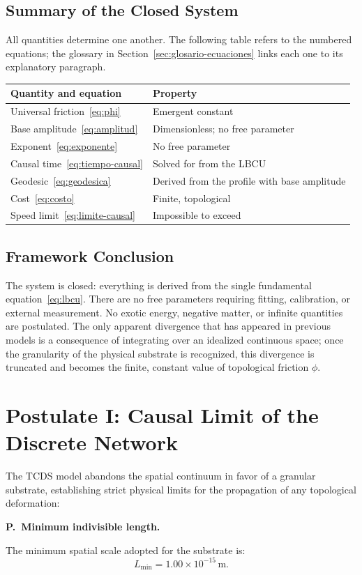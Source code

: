 \documentclass[10pt,a4paper,twocolumn]{article}
\newcounter{parrafoecuacion}
\newcommand{\parrafoecuacion}[2]{%
    \par\smallskip\Needspace{6\baselineskip}%
    \noindent\refstepcounter{parrafoecuacion}\label{#1}%
    \textbf{P\theparrafoecuacion.\ #2.}\enspace
}
\begin{document}
\subsection{Summary of the Closed System}
All quantities determine one another. The following table refers to the numbered equations; the glossary in Section~\ref{sec:glosario-ecuaciones} links each one to its explanatory paragraph.
\begin{center}
    \small
    \setlength{\tabcolsep}{3pt}
    \begin{tabularx}{\linewidth}{@{}>{\raggedright\arraybackslash}X >{\raggedright\arraybackslash}X@{}}
        \toprule
        Quantity and equation & Property\\
        \midrule
        Universal friction~\eqref{eq:phi} & Emergent constant\\
        Base amplitude~\eqref{eq:amplitud} & Dimensionless; no free parameter\\
        Exponent~\eqref{eq:exponente} & No free parameter\\
        Causal time~\eqref{eq:tiempo-causal} & Solved for from the LBCU\\
        Geodesic~\eqref{eq:geodesica} & Derived from the profile with base amplitude\\
        Cost~\eqref{eq:costo} & Finite, topological\\
        Speed limit~\eqref{eq:limite-causal} & Impossible to exceed\\
        \bottomrule
    \end{tabularx}
\end{center}

\subsection{Framework Conclusion}
The system is closed: everything is derived from the single fundamental equation~\eqref{eq:lbcu}. There are no free parameters requiring fitting, calibration, or external measurement. No exotic energy, negative matter, or infinite quantities are postulated. The only apparent divergence that has appeared in previous models is a consequence of integrating over an idealized continuous space; once the granularity of the physical substrate is recognized, this divergence is truncated and becomes the finite, constant value of topological friction $\phi$.

\section{Postulate I: Causal Limit of the Discrete Network}
The TCDS model abandons the spatial continuum in favor of a granular substrate, establishing strict physical limits for the propagation of any topological deformation:
\parrafoecuacion{par:longitud-minima}{Minimum indivisible length}
The minimum spatial scale adopted for the substrate is:
\begin{equation}
    L_{\text{min}} = 1.00 \times 10^{-15}\,\mathrm{m}.
    \label{eq:longitud-minima}
\end{equation}
\end{document}
